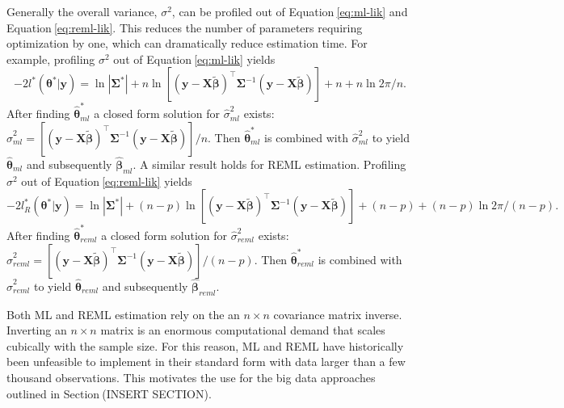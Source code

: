 \documentclass{article}
\begin{document}
Generally the overall variance, \(\sigma^2\), can be profiled out of
Equation\(~\)\ref{eq:ml-lik} and Equation\(~\)\ref{eq:reml-lik}. This
reduces the number of parameters requiring optimization by one, which
can dramatically reduce estimation time. For example, profiling
\(\sigma^2\) out of Equation\(~\)\ref{eq:ml-lik} yields
\begin{equation}\label{eq:ml-plik}
  -2l^*(\bm{\theta}^* | \mathbf{y}) = \ln{|\mathbf{\Sigma^*}|} + n\ln[(\mathbf{y} - \mathbf{X} \tilde{\bm{\beta}})^\intercal \mathbf{\Sigma}^{-1} (\mathbf{y} - \mathbf{X} \tilde{\bm{\beta}})] + n + n\ln{2\pi / n}.
\end{equation} After finding \(\hat{\bm{\theta}}^*_{ml}\) a closed form
solution for \(\hat{\sigma}^2_{ml}\) exists:
\(\hat{\sigma}^2_{ml} = [(\mathbf{y} - \mathbf{X} \bm{\tilde{\beta}})^\intercal \mathbf{\Sigma}^{-1} (\mathbf{y} - \mathbf{X} \tilde{\bm{\beta}})] / n\).
Then \(\bm{\hat{\theta}}^*_{ml}\) is combined with
\(\hat{\sigma}^2_{ml}\) to yield \(\bm{\hat{\theta}}_{ml}\) and
subsequently \(\bm{\hat{\beta}}_{ml}\). A similar result holds for REML
estimation. Profiling \(\sigma^2\) out of Equation\(~\)\ref{eq:reml-lik}
yields \begin{equation}\label{eq:reml-plik}
  -2l_R^*(\bm{\theta}^* | \mathbf{y}) = \ln{|\mathbf{\Sigma^*}|} + (n - p)\ln[(\mathbf{y} - \mathbf{X} \tilde{\bm{\beta}})^\intercal \mathbf{\Sigma}^{-1} (\mathbf{y} - \mathbf{X} \tilde{\bm{\beta}})] + (n - p) + (n - p)\ln2\pi / (n - p).
\end{equation} After finding \(\hat{\bm{\theta}}^*_{reml}\) a closed
form solution for \(\hat{\sigma}^2_{reml}\) exists:
\(\hat{\sigma}^2_{reml} = [(\mathbf{y} - \mathbf{X} \bm{\tilde{\beta}})^\intercal \mathbf{\Sigma}^{-1} (\mathbf{y} - \mathbf{X} \tilde{\bm{\beta}})] / (n - p)\).
Then \(\bm{\hat{\theta}}^*_{reml}\) is combined with
\(\hat{\sigma}^2_{reml}\) to yield \(\bm{\hat{\theta}}_{reml}\) and
subsequently \(\bm{\hat{\beta}}_{reml}\).

Both ML and REML estimation rely on the an \(n \times n\) covariance
matrix inverse. Inverting an \(n \times n\) matrix is an enormous
computational demand that scales cubically with the sample size. For
this reason, ML and REML have historically been unfeasible to implement
in their standard form with data larger than a few thousand
observations. This motivates the use for the big data approaches
outlined in Section\(~\)(INSERT SECTION).
\end{document}
